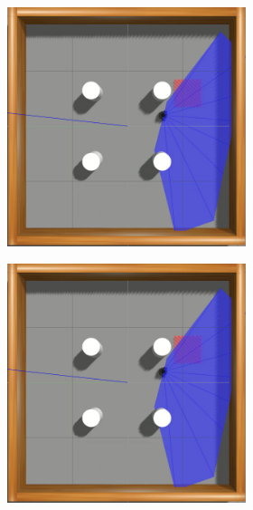 \begin{figure}[H]
\begin{center}
\begin{subfigure}[b]{0.60\textwidth}
\begin{subfigure}[b]{0.24\textwidth}
        \end{subfigure}
        \hfill
        \begin{subfigure}[b]{0.24\textwidth}
            \includegraphics[width=\textwidth]{imagens/simulated_envs/sim_env2_sac/7.png}
        \end{subfigure}
        \hfill
        \begin{subfigure}[b]{0.24\textwidth}
            \includegraphics[width=\textwidth]{imagens/simulated_envs/sim_env2_sac/7.png}

\end{subfigure}
\end{subfigure}
\end{center}
\end{figure}
